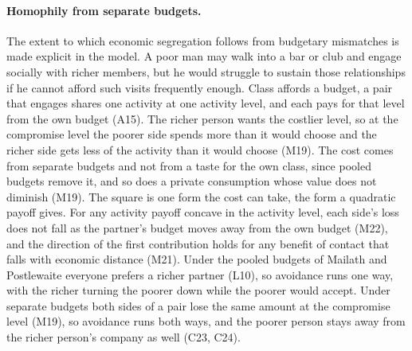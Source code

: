 \paragraph{Homophily from separate budgets.} The extent to which economic
segregation follows from budgetary mismatches is made explicit in the
model. A poor man may walk into a bar or club and engage socially with
richer members, but he would struggle to sustain those relationships if he
cannot afford such visits frequently enough. Class affords a budget, a pair
that engages shares one activity at one activity level, and each pays for
that level from the own budget (A15). The richer person wants the costlier
level, so at the compromise level the poorer side spends more than it
would choose and the richer side gets less of the activity than it would
choose (M19). The cost comes from separate budgets and not from a taste for
the own class, since pooled budgets remove it, and so does a private
consumption whose value does not diminish (M19). The square is one form
the cost can take, the form a quadratic payoff gives. For any activity
payoff concave in the activity level, each side's loss does not fall as
the partner's budget moves away from the own budget (M22), and the
direction of the first contribution holds for any benefit of contact that
falls with economic distance (M21). Under the pooled budgets of Mailath and
Postlewaite everyone prefers a richer partner (L10), so avoidance runs one
way, with the richer turning the poorer down while the poorer would
accept. Under separate budgets both sides of a pair lose the same amount at
the compromise level (M19), so avoidance runs both ways, and the poorer
person stays away from the richer person's company as well (C23, C24).

